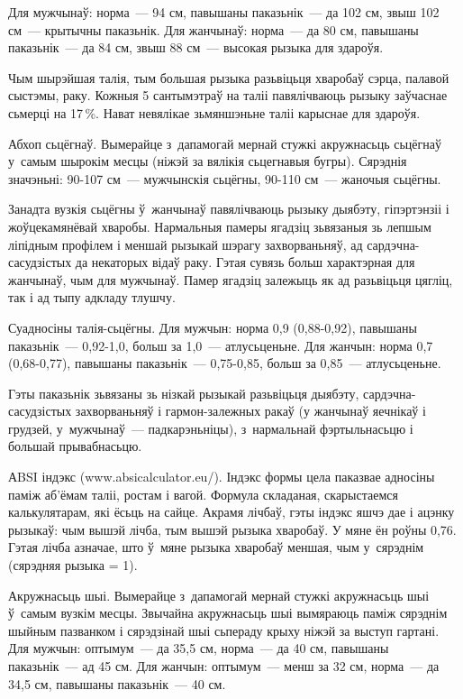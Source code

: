 Для мужчынаў: норма~--- 94 см, павышаны паказьнік~--- да 102 см, звыш 102 см~--- крытычны паказьнік. Для жанчынаў: норма~--- да 80 см, павышаны паказьнік~--- да 84 см, звыш 88 см~--- высокая рызыка для здароўя.

Чым шырэйшая талія, тым большая рызыка разьвіцьця хваробаў сэрца, палавой сыстэмы, раку. Кожныя 5 сантымэтраў на таліі павялічваюць рызыку заўчаснае сьмерці на 17\,\%. Нават невялікае зьмяншэньне таліі карыснае для здароўя.

Абхоп сьцёгнаў. Вымерайце з~дапамогай мернай стужкі акружнасьць сьцёгнаў у~самым шырокім месцы (ніжэй за вялікія сьцегнавыя бугры). Сярэднія значэньні: 90-107 см~--- мужчынскія сьцёгны, 90-110 см~--- жаночыя сьцёгны.

Занадта вузкія сьцёгны ў~жанчынаў павялічваюць рызыку дыябэту, гіпэртэнзіі і жоўцекамянёвай хваробы. Нармальныя памеры ягадзіц зьвязаныя зь лепшым ліпідным профілем і меншай рызыкай шэрагу захворваньняў, ад сардэчна-сасудзістых да некаторых відаў раку. Гэтая сувязь больш характэрная для жанчынаў, чым для мужчынаў. Памер ягадзіц залежыць як ад разьвіцьця цягліц, так і ад тыпу адкладу тлушчу.

Суадносіны талія-сьцёгны. Для мужчын: норма 0,9 (0,88-0,92), павышаны паказьнік~--- 0,92-1,0, больш за 1,0~--- атлусьценьне. Для жанчын: норма 0,7 (0,68-0,77), павышаны паказьнік~--- 0,75-0,85, больш за 0,85~--- атлусьценьне.

Гэты паказьнік зьвязаны зь нізкай рызыкай разьвіцьця дыябэту, сардэчна-сасудзістых захворваньняў і гармон-залежных ракаў (у жанчынаў яечнікаў і грудзей, у~мужчынаў~--- падкарэньніцы), з~нармальнай фэртыльнасьцю і большай прывабнасьцю.

АBSI індэкс (www.absicalculator.eu/). Індэкс формы цела паказвае адносіны паміж аб'ёмам таліі, ростам і вагой. Формула складаная, скарыстаемся калькулятарам, які ёсьць на сайце. Акрамя лічбаў, гэты індэкс яшчэ дае і ацэнку рызыкаў: чым вышэй лічба, тым вышэй рызыка хваробаў. У мяне ён роўны 0,76. Гэтая лічба азначае, што ў~мяне рызыка хваробаў меншая, чым у~сярэднім (сярэдняя рызыка = 1).

Акружнасьць шыі. Вымерайце з~дапамогай мернай стужкі акружнасьць шыі ў~самым вузкім месцы. Звычайна акружнасьць шыі вымяраюць паміж сярэднім шыйным пазванком і сярэдзінай шыі сьпераду крыху ніжэй за выступ гартані. Для мужчын: оптымум~--- да 35,5 см, норма~--- да 40 см, павышаны паказьнік~--- ад 45 см. Для жанчын: оптымум~--- менш за 32 см, норма~--- да 34,5 см, павышаны паказьнік~--- 40 см.

